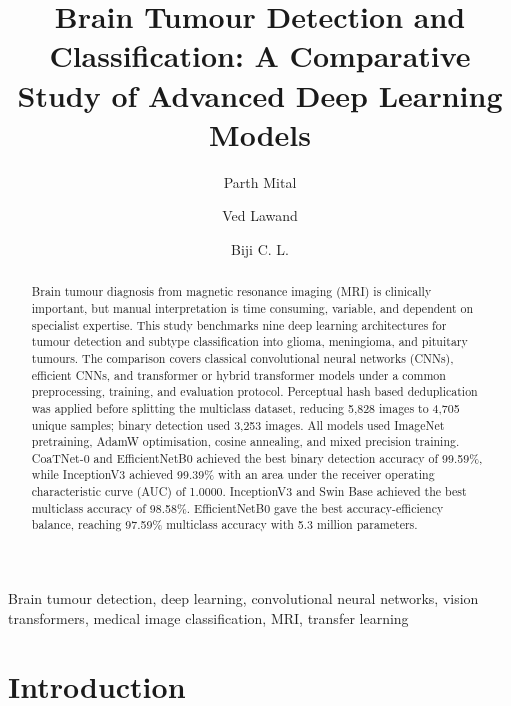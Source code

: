 \documentclass[final,3p,times,number]{elsarticle}
\begin{document}
\begin{frontmatter}

\title{Brain Tumour Detection and Classification: A Comparative Study of Advanced Deep Learning Models}

\author[vit]{Parth Mital}
\author[vit]{Ved Lawand}
\author[vit]{Biji C. L.}


\begin{abstract}
Brain tumour diagnosis from magnetic resonance imaging (MRI) is clinically important, but manual interpretation is time consuming, variable, and dependent on specialist expertise. This study benchmarks nine deep learning architectures for tumour detection and subtype classification into glioma, meningioma, and pituitary tumours. The comparison covers classical convolutional neural networks (CNNs), efficient CNNs, and transformer or hybrid transformer models under a common preprocessing, training, and evaluation protocol. Perceptual hash based deduplication was applied before splitting the multiclass dataset, reducing 5,828 images to 4,705 unique samples; binary detection used 3,253 images. All models used ImageNet pretraining, AdamW optimisation, cosine annealing, and mixed precision training. CoaTNet-0 and EfficientNetB0 achieved the best binary detection accuracy of 99.59\%, while InceptionV3 achieved 99.39\% with an area under the receiver operating characteristic curve (AUC) of 1.0000. InceptionV3 and Swin Base achieved the best multiclass accuracy of 98.58\%. EfficientNetB0 gave the best accuracy-efficiency balance, reaching 97.59\% multiclass accuracy with 5.3 million parameters.
\end{abstract}

\begin{keyword}
Brain tumour detection, deep learning, convolutional neural networks, vision transformers, medical image classification, MRI, transfer learning
\end{keyword}

\end{frontmatter}


\section{Introduction}
\end{document}
